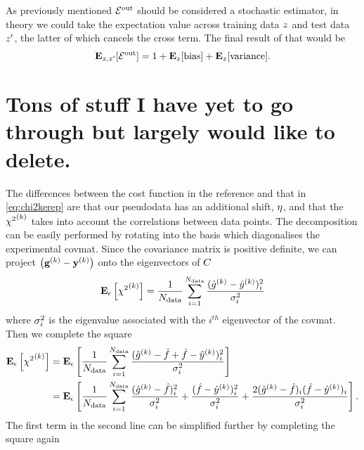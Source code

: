 As previously mentioned $\mathcal{E}^{\rm out}$ should be considered a stochastic estimator, in
theory we could take the expectation value across training data $z$ and
test data $z^{\prime}$, the latter of which cancels the cross term. The
final result of that would be
\begin{equation}
    \mathbf{E}_{z, z^\prime}[\mathcal{E}^{\rm out}] =
    1 + \mathbf{E}_{z}[{\rm bias}] + \mathbf{E}_{z}[{\rm variance}].
\end{equation}

\section{Tons of stuff I have yet to go through but largely would like to delete.}

The differences between the cost function in the reference and that in
\eqref{eq:chi2kerep} are that our pseudodata has an additional shift, $\eta$,
and that the ${\chi^2}^{(k)}$ takes into account the correlations between data points.
The decomposition can be easily performed by rotating into the basis which
diagonalises the experimental covmat. Since the covariance matrix is positive
definite, we can project $\left( \mathbf{g}^{(k)} - \mathbf{y}^{(k)} \right)$ onto the eigenvectors of $C$
\begin{equation}
    \mathbf{E}_{\epsilon}\left[ {\chi^2}^{(k)} \right] = \frac{1}{N_{\rm data}} \sum_{i=1}^{N_{\rm data}} \frac{(\hat{g}^{(k)} - \hat{y}^{(k)})_i^2}{\sigma^{2}_i}
\end{equation}
where $\sigma^{2}_i$ is the eigenvalue associated with the $i^{th}$ eigenvector of
the covmat. Then we complete the square
\begin{equation}\label{eq:chi2decomp1}
    \begin{split}
        \mathbf{E}_{\epsilon}\left[ {\chi^2}^{(k)} \right] &=
        \mathbf{E}_{\epsilon}\left[ \frac{1}{N_{\rm data}} \sum_{i=1}^{N_{\rm data}}
            \frac{
                (\hat{g}^{(k)} - \hat{f} + \hat{f} - \hat{y}^{(k)})_i^2
            }{\sigma^{2}_i}  \right] \\
        &= \mathbf{E}_{\epsilon}\left[ \frac{1}{N_{\rm data}} \sum_{i=1}^{N_{\rm data}}
            \frac{(\hat{g}^{(k)} - \hat{f})^2_i}{\sigma^{2}_i} +
            \frac{(\hat{f} - \hat{y}^{(k)})_i^2}{\sigma^{2}_i} +
            \frac{2(\hat{g}^{(k)} - \hat{f})_i(\hat{f} - \hat{y}^{(k)})_i}{\sigma^{2}_i} \right].
    \end{split}
\end{equation}
The first term in the second line can be simplified further by completing the
square again

